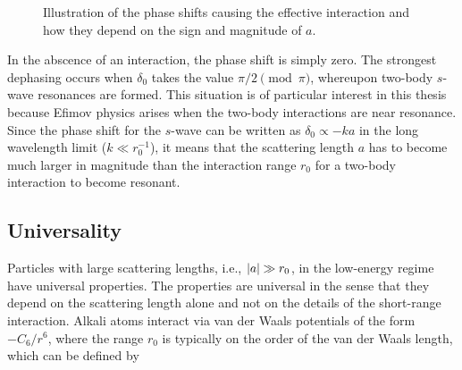 \begin{figure}
	\centering  
	\caption{Illustration of the phase shifts causing the effective interaction and how they depend on the sign and magnitude of $a$.}\label{fig:phaseshift}
\end{figure}
In the abscence of an interaction, the phase shift is simply zero. The strongest dephasing occurs when $\delta_0$ takes the value $\pi/2 \pmod{\pi}$, whereupon two-body $s$-wave resonances are formed. This situation is of particular interest in this thesis because Efimov physics arises when the two-body interactions are near resonance. Since the phase shift for the $s$-wave can be written as $\delta_0 \propto -ka$ in the long wavelength limit ($k \ll r_0^{-1}$), it means that the scattering length $a$ has to become much larger in magnitude than the interaction range $r_0$ for a two-body interaction to become resonant.

\subsection{Universality}
Particles with large scattering lengths, i.e., $\lvert a\rvert\gg r_0$, in the low-energy regime have universal properties. The properties are universal in the sense that they depend on the scattering length alone and not on the details of the short-range interaction. Alkali atoms interact via van der Waals potentials of the form $-C_6/r^6$, where the range $r_0$ is typically on the order of the van der Waals length, which can be defined by \cite{vanderWaals}

